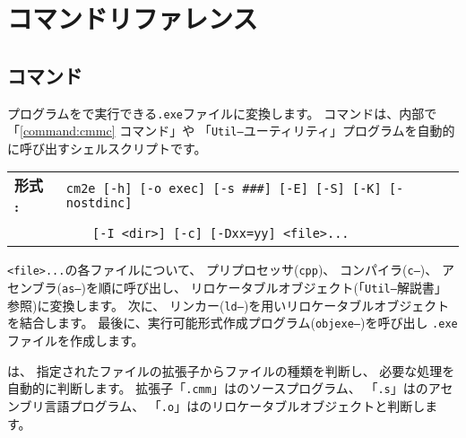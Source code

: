 % 
%
\chapter{コマンドリファレンス}
\label{app:command}


\section{{\cme}コマンド}

{\cmm}プログラムを{\tac}で実行できる{\tt .exe}ファイルに変換します。
{\cme}コマンドは、内部で「\ref{command:cmmc} {\cmmc}コマンド」や
「{\tt Util--}ユーティリティ」プログラムを自動的に呼び出すシェルスクリプトです。

\begin{flushleft}
\begin{tabular}{l l}
{\bf 形式 : } & \verb/cm2e [-h] [-o exec] [-s ###] [-E] [-S] [-K] [-nostdinc]/\\
              & ~~~ \verb/[-I <dir>] [-c] [-Dxx=yy] <file>.../
\end{tabular}
\end{flushleft}

{\tt <file>...}の各ファイルについて、
プリプロセッサ({\tt cpp})、
コンパイラ({\tt c--})、
アセンブラ({\tt as--})を順に呼び出し、
リロケータブルオブジェクト(「{\tt Util--}解説書」参照)に変換します。
次に、
リンカー({\tt ld--})を用いリロケータブルオブジェクトを結合します。
最後に、実行可能形式作成プログラム({\tt objexe--})を呼び出し
{\tt .exe}ファイルを作成します。

{\cme}は、
指定されたファイルの拡張子からファイルの種類を判断し、
必要な処理を自動的に判断します。
拡張子「{\tt .cmm}」は{\cmml}のソースプログラム、
「{\tt .s}」は{\tac}のアセンブリ言語プログラム、
「{\tt .o}」は{\tac}のリロケータブルオブジェクトと判断します。


